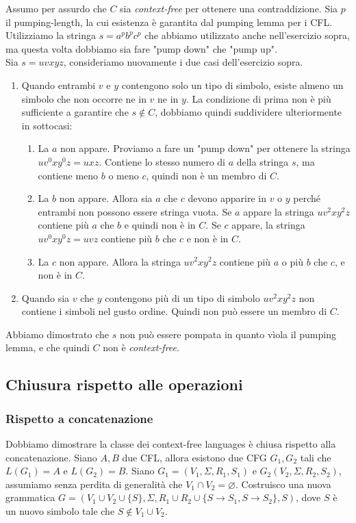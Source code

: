 \documentclass[italian]{article}
\begin{document}
	\noindent
	Assumo per assurdo che $C$ sia \textit{context-free} per ottenere una contraddizione. Sia $p$ il pumping-length, la cui esistenza è garantita dal pumping lemma per i CFL. Utilizziamo la stringa $s = a^pb^pc^p$ che abbiamo utilizzato anche nell'esercizio sopra, ma questa volta dobbiamo sia fare "pump down" che "pump up". \\
	Sia $s = uvxyz$, consideriamo nuovamente i due casi dell'esercizio sopra.
	\begin{enumerate}
		\item Quando entrambi $v$ e $y$ contengono solo un tipo di simbolo, esiste almeno un simbolo che non occorre ne in $v$ ne in $y$. La condizione di prima non è più sufficiente a garantire che $s \notin C$, dobbiamo quindi suddividere ulteriormente in sottocasi:
		\begin{enumerate}
			\item La $a$ non appare. Proviamo a fare un "pump down" per ottenere la stringa $uv^0xy^0z = uxz$. Contiene lo stesso numero di $a$ della stringa $s$, ma contiene meno $b$ o meno $c$, quindi non è un membro di $C$.
			\item  La $b$ non appare. Allora sia $a$ che $c$ devono apparire in $v$ o $y$ perché entrambi non possono essere stringa vuota. Se $a$ appare la stringa $uv^2xy^2z$ contiene più $a$ che $b$ e quindi non è in $C$. Se $c$ appare, la stringa $uv^0xy^0z = uvz$ contiene più $b$ che $c$ e non è in $C$.
			\item La $c$ non appare. Allora la stringa $uv^2xy^2z$ contiene più $a$ o più $b$ che $c$, e non è in $C$.
		\end{enumerate}
		\item Quando sia $v$ che $y$ contengono più di un tipo di simbolo  $uv^2xy^2z$ non contiene i simboli nel gusto ordine. Quindi non può essere un membro di $C$. 
	\end{enumerate}
	Abbiamo dimostrato che $s$ non può essere pompata in quanto vìola il pumping lemma, e che quindi $C$ non è \textit{context-free}.
	
	\subsection{Chiusura rispetto alle operazioni}
	\subsubsection{Rispetto a concatenazione}
	Dobbiamo dimostrare la classe dei context-free languages è chiusa rispetto alla concatenazione. Siano $A,B$ due CFL, allora esistono due CFG $G_1, G_2$ tali che $L(G_1) = A$ e $L(G_2) = B$. Siano $G_1 = (V_1, \Sigma, R_1, S_1)$ e $G_2(V_2, \Sigma, R_2, S_2)$, assumiamo senza perdita di generalità che $V_1 \cap V_2 = \varnothing$. Costruisco una nuova grammatica $G = (V_1 \cup V_2 \cup \{S\}, \Sigma, R_1 \cup R_2 \cup \{ S\to S_1, S \to S_2 \}, S)$, dove $S$ è un nuovo simbolo tale che $S \notin V_1 \cup V_2$.
\end{document}

